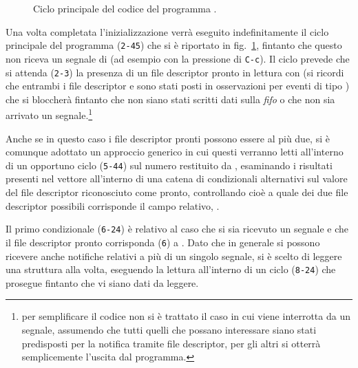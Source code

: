 \begin{figure}[!htb]
  \footnotesize \centering
  \begin{minipage}[c]{\codesamplewidth}
  \end{minipage} 
  \normalsize 
  \caption{Ciclo principale del codice del programma .}
  \label{fig:fiforeporter_code_body}
\end{figure}

Una volta completata l'inizializzazione verrà eseguito indefinitamente il
ciclo principale del programma (\texttt{\small 2-45}) che si è riportato in
fig.~\ref{fig:fiforeporter_code_body}, fintanto che questo non riceva un
segnale di  (ad esempio con la pressione di \texttt{C-c}). Il
ciclo prevede che si attenda (\texttt{\small 2-3}) la presenza di un file
descriptor pronto in lettura con  (si ricordi che entrambi i
file descriptor  e  sono stati posti in osservazioni
per eventi di tipo ) che si bloccherà fintanto che non siano
stati scritti dati sulla \textit{fifo} o che non sia arrivato un
segnale.\footnote{per semplificare il codice non si è trattato il caso in cui
   viene interrotta da un segnale, assumendo che tutti
  quelli che possano interessare siano stati predisposti per la notifica
  tramite file descriptor, per gli altri si otterrà semplicemente l'uscita dal
  programma.}

Anche se in questo caso i file descriptor pronti possono essere al più due, si
è comunque adottato un approccio generico in cui questi verranno letti
all'interno di un opportuno ciclo (\texttt{\small 5-44}) sul numero
restituito da , esaminando i risultati presenti nel vettore
 all'interno di una catena di condizionali alternativi sul valore
del file descriptor riconosciuto come pronto, controllando cioè a quale dei
due file descriptor possibili corrisponde il campo relativo,
.

Il primo condizionale (\texttt{\small 6-24}) è relativo al caso che si sia
ricevuto un segnale e che il file descriptor pronto corrisponda
(\texttt{\small 6}) a . Dato che in generale si possono ricevere
anche notifiche relativi a più di un singolo segnale, si è scelto di leggere
una struttura  alla volta, eseguendo la lettura
all'interno di un ciclo (\texttt{\small 8-24}) che prosegue fintanto che vi
siano dati da leggere.

